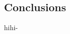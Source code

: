 \documentclass{article}
\begin{document}
\begin{multicols}{2}
\section{Conclusions}
hihi-\cite{Overleaf}






\end{multicols}
\end{document}
